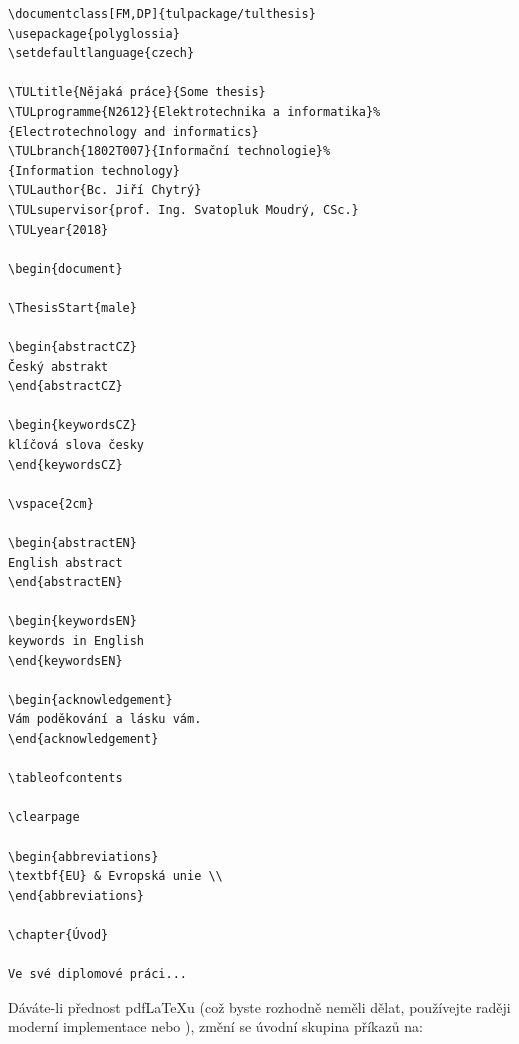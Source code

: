 \documentclass[a4paper,11pt,fonts,numbering,twoside,margins,listingsleft]{./tulpackage/tulthesis}
\begin{document}
\begin{slisting}
{
\begin{verbatim}
\documentclass[FM,DP]{tulpackage/tulthesis}
\usepackage{polyglossia}
\setdefaultlanguage{czech}

\TULtitle{Nějaká práce}{Some thesis}
\TULprogramme{N2612}{Elektrotechnika a informatika}%
{Electrotechnology and informatics}
\TULbranch{1802T007}{Informační technologie}%
{Information technology}
\TULauthor{Bc. Jiří Chytrý}
\TULsupervisor{prof. Ing. Svatopluk Moudrý, CSc.}
\TULyear{2018}

\begin{document}

\ThesisStart{male}

\begin{abstractCZ}
Český abstrakt
\end{abstractCZ}

\begin{keywordsCZ}
klíčová slova česky
\end{keywordsCZ}

\vspace{2cm}

\begin{abstractEN}
English abstract
\end{abstractEN}

\begin{keywordsEN}
keywords in English
\end{keywordsEN}

\begin{acknowledgement}
Vám poděkování a lásku vám.
\end{acknowledgement}

\tableofcontents

\clearpage

\begin{abbreviations}
\textbf{EU} & Evropská unie \\
\end{abbreviations}

\chapter{Úvod}

Ve své diplomové práci...
\end{verbatim}
}
\end{slisting}


Dáváte-li přednost pdf\LaTeX{}u (což byste rozhodně neměli dělat, používejte raději
moderní implementace \XeLaTeX{} nebo \LuaLaTeX{}), změní se úvodní skupina příkazů na:
\end{document}
